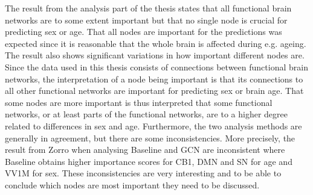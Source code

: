 

        


The result from the analysis part of the thesis states that all functional brain networks are to some extent important but that no single node is crucial for predicting sex or age. That all nodes are important for the predictions was expected since it is reasonable that the whole brain is affected during e.g. ageing. The result also shows significant variations in how important different nodes are. Since the data used in this thesis consists of connections between functional brain networks, the interpretation of a node being important is that its connections to all other functional networks are important for predicting sex or brain age. That some nodes are more important is thus interpreted that some functional networks, or at least parts of the functional networks, are to a higher degree related to differences in sex and age. Furthermore, the two analysis methods are generally in agreement, but there are some inconsistencies. More precisely, the result from Zorro when analysing Baseline and GCN are inconsistent where Baseline obtains higher importance scores for CB1, DMN and SN for age and VV1M for sex. These inconsistencies are very interesting and to be able to conclude which nodes are most important they need to be discussed. 

